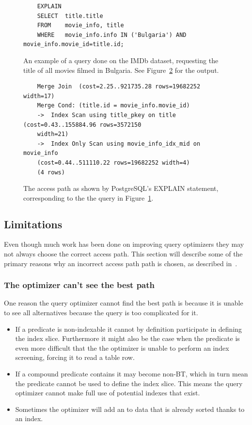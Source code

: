 \begin{figure}[ht]
  \begin{verbatim}
    EXPLAIN
    SELECT  title.title
    FROM    movie_info, title
    WHERE   movie_info.info IN ('Bulgaria') AND movie_info.movie_id=title.id;
  \end{verbatim}
  \caption[An example query to ]{An example of a query done on the
    IMDb dataset, requesting the title of all movies filmed in Bulgaria. See
    Figure~\ref{fig:sql:explaintrace} for the
    output.}\label{fig:sql:explainquery}
\end{figure}

\begin{figure}[ht]
  \begin{lstlisting}
    Merge Join  (cost=2.25..921735.28 rows=19682252 width=17)
    Merge Cond: (title.id = movie_info.movie_id)
    ->  Index Scan using title_pkey on title  (cost=0.43..155884.96 rows=3572150
    width=21)
    ->  Index Only Scan using movie_info_idx_mid on movie_info
    (cost=0.44..511110.22 rows=19682252 width=4)
    (4 rows)
  \end{lstlisting}
  \caption[An example of an  trace]{The access path as shown by
    PostgreSQL's EXPLAIN statement, corresponding to the the query in
    Figure~\ref{fig:sql:explainquery}.}\label{fig:sql:explaintrace}
\end{figure}

\subsection{Limitations}
Even though much work has been done on improving query optimizers they may not
always choose the correct access path. This section will describe some of the
primary reasons why an incorrect access path path is chosen, as described
in~\cite[Ch. 14]{lahdenmaki_2005_relational_rdidatodossea}.

\subsubsection{The optimizer can't see the best path}
One reason the query optimizer cannot find the best path is because it is unable
to see all alternatives because the query is too complicated for it.

\begin{itemize}
\item If a predicate is non-indexable it cannot by definition participate in
  defining the index slice. Furthermore it might also be the case when the
  predicate is even more difficult that the the optimizer is unable to perform
  an index screening, forcing it to read a table row.
\item If a compound predicate contains  it may become non-BT, which in
  turn mean the predicate cannot be used to define the index slice. This means
  the query optimizer cannot make full use of potential indexes that exist.
\item Sometimes the optimizer will add an  to data that is already
  sorted thanks to an index.
\end{itemize}

